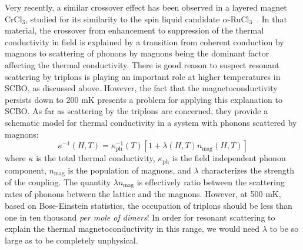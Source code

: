\documentclass{thesis-umich}
\begin{document}
Very recently, a similar crossover effect has been observed in a layered magnet CrCl$_3$, studied for its similarity to the spin liquid candidate $\alpha$-RuCl$_3$~\cite{Pocs2019}. In that material, the crossover from enhancement to suppression of the thermal conductivity in field is explained by a transition from coherent conduction by magnons to scattering of phonons by magnons being the dominant factor affecting the thermal conductivity. There is good reason to suspect resonant scattering by triplons is playing an important role at higher temperatures in SCBO, as discussed above. However, the fact that the magnetoconductivity persists down to 200 mK presents a problem for applying this explanation to SCBO. As far as scattering by the triplons are concerned, they provide a schematic model for thermal conductivity in a system with phonons scattered by magnons:
\[\kappa^{-1}(H,T) = \kappa^{-1}_{\mathrm{ph}}(T)[1 + \lambda(H,T)n_{\mathrm{mag}}(H,T)]\]
where $\kappa$ is the total thermal conductivity, $\kappa_{\mathrm{ph}}$ is the field independent phonon component, $n_{\mathrm{mag}}$ is the population of magnons, and $\lambda$ characterizes the strength of the coupling. The quantity $\lambda n_{\mathrm{mag}}$ is effectively ratio between the scattering rates of phonons between the lattice and the magnons. However, at 500 mK, based on Bose-Einstein statistics, the occupation of triplons should be less than one in ten thousand \textit{per mole of dimers}! In order for resonant scattering to explain the thermal magnetoconductivity in this range, we would need $\lambda$ to be so large as to be completely unphysical. 
\end{document}
